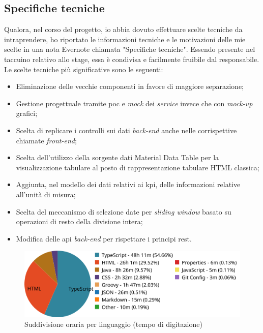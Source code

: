 \subsection{Specifiche tecniche}
Qualora, nel corso del progetto, io abbia dovuto effettuare scelte tecniche da intraprendere, ho riportato le informazioni tecniche e le motivazioni delle mie scelte in una nota Evernote chiamata "Specifiche tecniche". Essendo presente nel taccuino relativo allo stage, essa è condivisa e facilmente fruibile dal responsabile.
Le scelte tecniche più significative sono le seguenti:
\begin{itemize}
    \item Eliminazione delle vecchie componenti in favore di maggiore separazione;
    \item Gestione progettuale tramite \acrshort{poc} e \textit{mock} dei \textit{service} invece che con \textit{mock-up} grafici;
    \item Scelta di replicare i controlli sui dati \textit{back-end} anche nelle corrispettive chiamate \textit{front-end};
    \item Scelta dell'utilizzo della sorgente dati Material Data Table per la visualizzazione tabulare al posto di rappresentazione tabulare HTML classica;
    \item Aggiunta, nel modello dei dati relativi ai \acrshort{kpi}, delle informazioni relative all'unità di misura;
    \item Scelta del meccanismo di selezione date per \textit{sliding window} basato su operazioni di resto della divisione intera;
    \item Modifica delle \acrshort{api} \textit{back-end} per rispettare i principi \acrshort{rest}.
\end{itemize}
\begin{figure}[H]
    \centering
    \includegraphics[width=0.9\columnwidth]{immagini/linguaggi.png}
    \caption{Suddivisione oraria per linguaggio (tempo di digitazione)}
    \label{fig:languages}
\end{figure}

